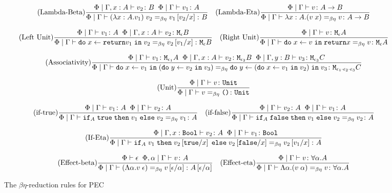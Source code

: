 \documentclass{Report}
\begin{document}
\begin{figure}[h!]
    \[
        \treerule{Lambda-Beta}{\etyperelation{\P}{\gax}{v_2}{B}\s\s \gpetyperelation{v_1}{A}}{\gpeberelation{\apply{(\lam{x}{A}{v_1})}{v_2} }{ v_1\ssub{x}{v_2}}{B}}
        \quad
        \treerule{Lambda-Eta}{\gpetyperelation{v}{\ab}}{\gpeberelation{\lam{x}{A}{(\apply{v}{x}})}{v}{\ab}}
    \]

    \[
        \treerule{Left Unit}{\gpetyperelation{v_1}{A} \s\s \etyperelation{\P}{\gax}{v_2}{\meb}}{\gpeberelation{\doin{x}{\return{v_1}}{v_2}}{v_2\ssub{x}{v_1}}{\meb}}
        \quad
        \treerule{Right Unit}{\gpetyperelation{v}{\mea}}{\gpeberelation{\doin{x}{v}{\return{x}} }{v}{\mea}}
    \]

    \[
        \treerule{Associativity}{\gpetyperelation{v_1}{\M{\e_1}{A}} \s\s \etyperelation{\P}{\gax}{v_2}{\M{\e_2}{B}}\s\s \etyperelation{\P}{\gby}{v_3}{\M{\e_3}{C}}}{
            \gpeberelation{\doin{x}{v_1}{(\doin{y}{v_2}{v_3})}}{\doin{y}{(\doin{x}{v_1}{v_2})}{v_3}}{\M{\e_1 \dot \e_2 \dot \e_3}{C}}
        }
    \]

    \[
        \treerule{Unit}{\gpetyperelation{v}{\U}}{\gpeberelation{v}{\u}{\U}}
    \]

    \[
        \treerule{if-true}{\gpetyperelation{v_1}{A}\s\s\gpetyperelation{v_2}{A}}{\gpeberelation{\pifthenelse{A}{\t}{v_1}{v_2}}{v_1}{A}}
        \quad
        \treerule{if-false}{\gpetyperelation{v_2}{A}\s\s\gpetyperelation{v_1}{A}}{\gpeberelation{\pifthenelse{A}{\f}{v_1}{v_2}}{v_2}{A}}    
    \]

    \[
        \treerule{If-Eta}{\etyperelation{\P}{\G, x: \B}{v_2}{A}\s\s\gpetyperelation{v_1}{\B}}{\gpeberelation{\pifthenelse{A}{v_1}{v_2\ssub{x}{\t}}{v_2\ssub{x}{\f}}}{v_2\ssub{x}{v_1}}{A}}
    \]

    \[
        \treerule{Effect-beta}{\wellformed{\P}{\e}\s\s\etyperelation{\P, \a}{\G}{v}{A}}{\gpeberelation{\eapp{(\elam{\a}{v}}{\e})}{v\ssub{\a}{\e}}{A\ssub{\a}{\e}}}
        \quad 
        \treerule{Effect-eta}{\etyperelation{\P}{\G}{v}{\all{\a}{A}}}{\gpeberelation{\elam{\a}{(\eapp{v}{\a})}}{v}{\all{\a}{A}}}
    \]
    \caption{The $\beta\eta$-reduction rules for PEC}
    \label{BetaEtaReductions}
\end{figure}
\end{document}
